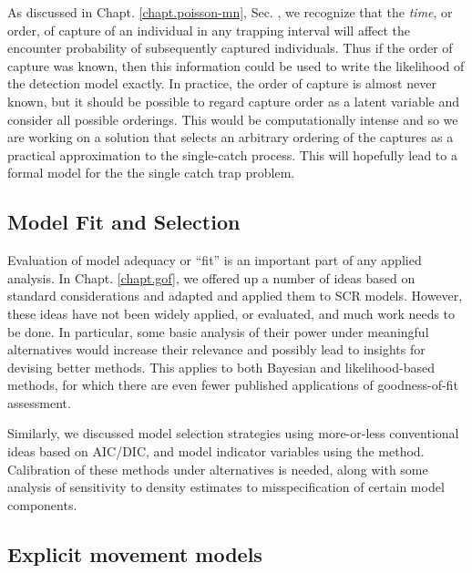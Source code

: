 As discussed in Chapt. \ref{chapt.poisson-mn},
Sec. \label{poisson-mn.sec.singlecatch}, we recognize that the {\it
  time}, or order, of capture of an individual in any trapping
interval will affect the encounter probability of subsequently
captured individuals. Thus if the order of capture was known, then
this information could be used to write the likelihood of the
detection model exactly. In practice, the order of capture is almost
never known, but it should be possible to regard capture order as a
latent variable and consider all possible orderings.  This would be
computationally intense and so we are working on a solution that
selects an arbitrary ordering of the captures as a practical
approximation to the single-catch process. This will hopefully lead to
a formal model for the the single catch trap problem.

\subsection{Model Fit and Selection}

Evaluation of model adequacy or ``fit'' is an important part of any
applied analysis. In Chapt. \ref{chapt.gof}, we offered up a number of
ideas based on standard considerations and adapted and applied them
to SCR models. However, these ideas have not been widely applied, or
evaluated, and much work needs to be done. In particular, some basic
analysis of their power under meaningful alternatives would increase
their relevance and possibly lead to insights for devising better
methods. This applies to both Bayesian and likelihood-based methods,
for which there are even fewer published applications of
goodness-of-fit assessment.

Similarly, we discussed model selection strategies using more-or-less
conventional ideas based on AIC/DIC, and model indicator variables
using the \citet{kuo_mallick:1998} method. Calibration of these
methods under alternatives is needed, along with some analysis of
sensitivity to density estimates to misspecification of certain model
components.


\subsection{Explicit movement models}



